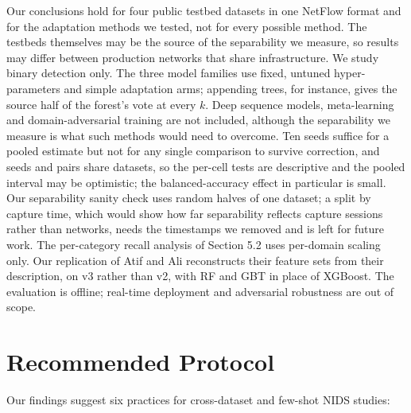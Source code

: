 \documentclass[11pt]{article}
\begin{document}
Our conclusions hold for four public testbed datasets in one NetFlow format and for the adaptation methods we tested, not for every possible method. The testbeds themselves may be the source of the separability we measure, so results may differ between production networks that share infrastructure. We study binary detection only. The three model families use fixed, untuned hyper-parameters and simple adaptation arms; appending trees, for instance, gives the source half of the forest's vote at every $k$. Deep sequence models, meta-learning and domain-adversarial training are not included, although the separability we measure is what such methods would need to overcome. Ten seeds suffice for a pooled estimate but not for any single comparison to survive correction, and seeds and pairs share datasets, so the per-cell tests are descriptive and the pooled interval may be optimistic; the balanced-accuracy effect in particular is small. Our separability sanity check uses random halves of one dataset; a split by capture time, which would show how far separability reflects capture sessions rather than networks, needs the timestamps we removed and is left for future work. The per-category recall analysis of Section 5.2 uses per-domain scaling only. Our replication of Atif and Ali reconstructs their feature sets from their description, on v3 rather than v2, with RF and GBT in place of XGBoost. The evaluation is offline; real-time deployment and adversarial robustness are out of scope.

\section{Recommended Protocol}

Our findings suggest six practices for cross-dataset and few-shot NIDS studies:
\end{document}
